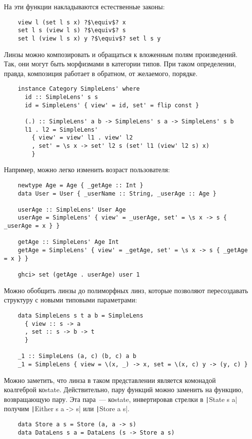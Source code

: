 На эти функции накладываются естественные законы:
\begin{verbatim}
    view l (set l s x) ?$\equiv$? x
    set l s (view l s) ?$\equiv$? s
    set l (view l s x) y ?$\equiv$? set l s y
\end{verbatim}

Линзы можно композировать и обращаться к вложенным полям произведений.
Так, они могут быть морфизмами в категории типов.
При таком определении, правда, композиция работает в обратном, от желаемого, порядке.
\begin{verbatim}
    instance Category SimpleLens' where
      id :: SimpleLens' s s
      id = SimpleLens' { view' = id, set' = flip const }

      (.) :: SimpleLens' a b -> SimpleLens' s a -> SimpleLens' s b
      l1 . l2 = SimpleLens'
        { view' = view' l1 . view' l2
        , set' = \s x -> set' l2 s (set' l1 (view' l2 s) x)
        }
\end{verbatim}

Например, можно легко изменить возраст пользователя:
\begin{verbatim}
    newtype Age = Age { _getAge :: Int }
    data User = User { _userName :: String, _userAge :: Age }

    userAge :: SimpleLens' User Age
    userAge = SimpleLens' { view' = _userAge, set' = \s x -> s { _userAge = x } }

    getAge :: SimpleLens' Age Int
    getAge = SimpleLens' { view' = _getAge, set' = \s x -> s { _getAge = x } }

    ghci> set (getAge . userAge) user 1
\end{verbatim}

Можно обобщить линзы до полиморфных линз, которые позволяют пересоздавать структуру с новыми типовыми параметрами:
\begin{verbatim}
    data SimpleLens s t a b = SimpleLens
      { view :: s -> a
      , set :: s -> b -> t
      }

    _1 :: SimpleLens (a, c) (b, c) a b
    _1 = SimpleLens { view = \(x, _) -> x, set = \(x, c) y -> (y, c) }
\end{verbatim}

Можно заметить, что линза в таком представлении является комонадой коалгеброй коstate.
Действительно, пару функций можно заменить на функцию, возвращающую пару.
Эта пара~--- коstate, инвертировав стрелки в \texttt|State s a| получим \texttt|Either s a -> s| или \texttt|Store a s|.
\begin{verbatim}
    data Store a s = Store (a, a -> s)
    data DataLens s a = DataLens (s -> Store a s)
\end{verbatim}

